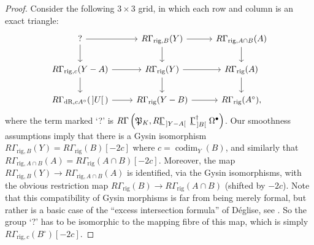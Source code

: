 \documentclass[cjm]{ipart}
\theoremstyle{plain}
\theoremstyle{remark}
\DeclareMathOperator{\codim}{codim}
\DeclarePairedDelimiter{\tb}{{\,]}}{{[\, }} %
\newcommand{\dR}{\mathrm{dR}}
\newcommand{\fP}{\mathfrak{P}}
\newcommand{\rig}{\mathrm{rig}}
\newcommand{\uGa}{\underline{\Gamma}}
\numberwithin{equation}{subsection}
\begin{document}
  \begin{proof}
   Consider the following $3 \times 3$ grid, in which each row and column is an exact triangle:
   \[\begin{tikzcd}
    ? \arrow[r] \arrow[d]                       & {R\Gamma_{\rig, B}(Y)} \ar[d]\ar[r]  & {R\Gamma_{\rig, A \cap B}(A)} \arrow[d] \\
    {R\Gamma_{\rig, c}(Y-A)} \arrow[d] \arrow[r] & R\Gamma_\rig(Y) \arrow[d] \arrow[r] & R\Gamma_{\rig}(A) \arrow[d]             \\
    {R\Gamma_{\dR,cA^\circ}(\tb{U})} \arrow[r]      & R\Gamma_\rig(Y-B) \arrow[r]          & R\Gamma_{\rig}(A^\circ),
   \end{tikzcd}\]
   where the term marked `?' is $R\Gamma\left(\fP_K, R\uGa_{\tb{Y-A}}\ \uGa^\dag_{\tb{B}}\, \Omega^\bullet\right)$. Our smoothness assumptions imply that there is a Gysin isomorphism $R\Gamma_{\rig, B}(Y) = R\Gamma_{\rig}(B)[-2c]$ where $c = \codim_Y(B)$, and similarly that $R\Gamma_{\rig, A \cap B}(A) = R\Gamma_{\rig}(A\cap B)[-2c]$. Moreover, the map $R\Gamma_{\rig, B}(Y) \to R\Gamma_{\rig, A \cap B}(A)$ is identified, via the Gysin isomorphisms, with the obvious restriction map $R\Gamma_{\rig}(B) \to R\Gamma_{\rig}(A \cap B)$ (shifted by $-2c$). Note that this compatibility of Gysin morphisms is far from being merely formal, but rather is a basic case of the ``excess intersection formula'' of D\'eglise, see \cite[Proposition 4.10]{deglise08}. So the group `$?$' has to be isomorphic to the mapping fibre of this map, which is simply $R\Gamma_{\rig, c}(B^\circ)[-2c]$.


\end{proof}
\end{document}
